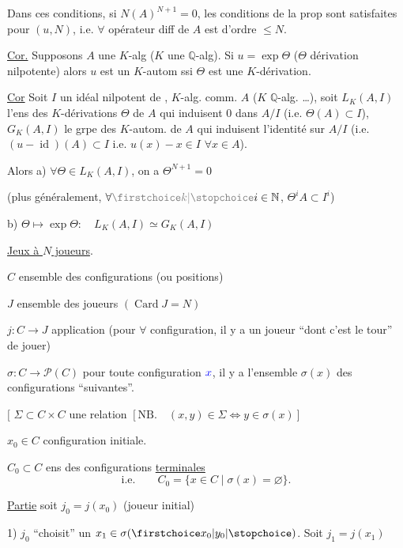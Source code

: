 Dans ces conditions, \deleted{\unsure{\exists}} si  $N(A)^{N+1}=0$, les conditions de la prop sont satisfaites pour $(u,N)$, i.e. $\forall$ opérateur diff de $A$ est d'ordre $\leq N$.

\uline{Cor.} Supposons $A$ une $K$-alg ($K$ une $\mathbb{Q}$-alg). Si $u=\exp\Theta$ ($\Theta$ dérivation nilpotente) alors $u$ est un $K$-autom ssi $\Theta$ est une $K$-dérivation.

\uline{Cor} Soit $I$ un idéal nilpotent de , $K$-alg. comm. $A$ ($K$ $\mathbb{Q}$-alg. \ldots),  soit $L_K(A,I)$ l'ens des $K$-dérivations $\Theta$  de $A$ qui induisent $0$ dans $A/I$ (i.e. $\Theta(A)\subset I$), $G_K(A,I)$ le grpe des $K$-autom. de $A$  qui induisent l'identité sur  $A/I$ (i.e. $(u-\operatorname{id})(A)\subset I$ i.e. $u(x)-x\in I$ $\forall x\in A$).

Alors a) $\forall\Theta\in L_K(A,I)$, on a $\Theta^{N+1}=0$

(plus généralement, $\forall\deleted{\unsure{k}}i\in\mathbb{N}$, $\Theta^i A\subset I^i$)

b) $\Theta\longmapsto\exp\Theta:\quad L_K(A,I)\simeq G_K(A,I)$

\uline{Jeux à $N$ joueurs}.

$C$ ensemble des configurations (ou positions)

$J$ ensemble des joueurs $(\operatorname{Card}J=N)$

$j:C\longrightarrow J$ application (pour $\forall$ configuration, il y a un joueur ``dont c'est le tour'' de jouer)

$\sigma:C\longrightarrow\mathcal P(C)$ pour toute configuration ${\color{blue}x}$, il y a l'ensemble $\sigma(x)$ des configurations ``suivantes''.

$\bigl[$ $\Sigma\subset C\times C$ une relation $[\mathrm{NB}.\quad(x,y)\in\Sigma\Longleftrightarrow y\in\sigma(x)]$

$x_0\in C$ configuration initiale.

$C_0\subset C$ ens des configurations  \uline{terminales}
\[
\text{i.e.}\qquad C_0=\{x\in C\mid\sigma(x)=\varnothing\}.
\]

 \uline{Partie} soit $j_0=j(x_0)$ (joueur initial)

1) $j_0$ ``choisit'' un $x_1\in\sigma(\unsure{x_0|y_0})$. Soit $j_1=j(x_1)$

